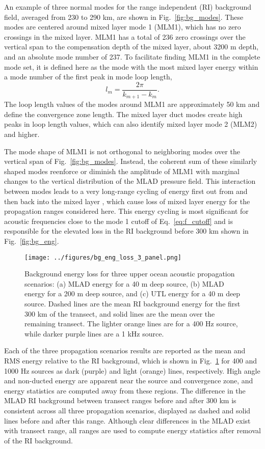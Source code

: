\documentclass[preprint,NumberedRefs]{JASA}
\begin{document}
An example of three normal modes for the range independent (RI) background field, averaged from 230 to 290 km, are shown in Fig.~\ref{fig:bg_modes}. These modes are centered around mixed layer mode 1 (MLM1), which has no zero crossings in the mixed layer. MLM1 has a total of 236 zero crossings over the vertical span to the compensation depth of the mixed layer, about 3200 m depth, and an absolute mode number of 237. To facilitate finding MLM1 in the complete mode set, it is defined here as the mode with the most mixed layer energy within a mode number of the first peak in mode loop length\citep{jensen2011computational},
\begin{equation}
    l_{m} = \frac{2 \pi}{k_{m+1} - k_m}.
    \label{eq:loop_length}
\end{equation}
The loop length values of the modes around MLM1 are approximately 50 km and define the convergence zone length. The mixed layer duct modes create high peaks in loop length values, which can also identify mixed layer mode 2 (MLM2) and higher.

The mode shape of MLM1 is not orthogonal to neighboring modes over the vertical span of Fig.~\ref{fig:bg_modes}. Instead, the coherent sum of these similarly shaped modes reenforce or diminish the amplitude of MLM1 with marginal changes to the vertical distribution of the MLAD pressure field. This interaction between modes leads to a very long-range cycling of energy first out from and then back into the mixed layer \citep{porter93,colosi2020observations}, which cause loss of mixed layer energy for the propagation ranges considered here. This energy cycling is most significant for acoustic frequencies close to the mode 1 cutoff of Eq.~\eqref{eq:f_cutoff} and is responsible for the elevated loss in the RI background before 300 km shown in Fig.~\ref{fig:bg_eng}.

\begin{figure}
\texttt{[image: ../figures/bg\_eng\_loss\_3\_panel.png]}
        \caption{Background energy loss for three upper ocean acoustic propagation scenarios: (a) MLAD energy for a 40 m deep source, (b) MLAD energy for a 200 m deep source, and (c) UTL energy for a 40 m deep source. Dashed lines are the mean RI background energy for the first 300 km of the transect, and solid lines are the mean over the remaining transect. The lighter orange lines are for a 400 Hz source, while darker purple lines are a 1 kHz source.}
    \label{fig:eng_bg_3}
\end{figure}

Each of the three propagation scenarios results are reported as the mean and RMS energy relative to the RI background, which is shown in Fig.~\ref{fig:eng_bg_3} for 400 and 1000 Hz sources as dark (purple) and light (orange) lines, respectively. High angle and non-ducted energy are apparent near the source and convergence zone, and energy statistics are computed away from these regions. The difference in the MLAD RI background between transect ranges before and after 300 km is consistent across all three propagation scenarios, displayed as dashed and solid lines before and after this range. Although clear differences in the MLAD exist with transect range, all ranges are used to compute energy statistics after removal of the RI background.
\end{document}
